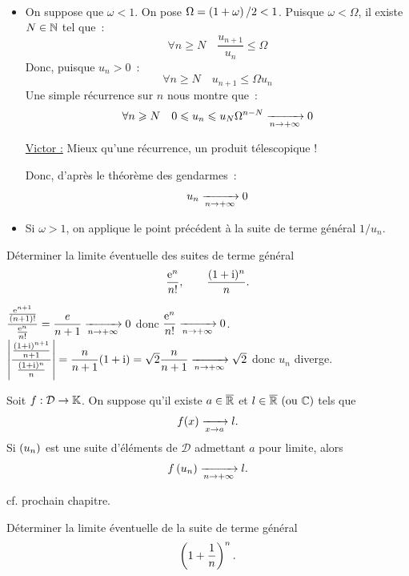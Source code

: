 \documentclass{magnoliaold}
\begin{document}
\begin{preuve}
$\quad$
\begin{itemize}
\item On suppose que $\omega<1$. On pose $\Omega=\left(1+\omega\right)/2 <1$. Puisque
  $\omega < \Omega$, il existe $N\in\mathbb{N}$ tel que~:
  \[\forall n\geq N \quad \frac{u_{n+1}}{u_n}\leq \Omega\]
  Donc, puisque $u_n>0$~:
  \[\forall n\geq N \quad u_{n+1} \leq \Omega u_n\]
  Une simple récurrence sur $n$ nous montre que~:
  \[\forall n\geqslant N\quad 0\leqslant u_n \leqslant u_N \Omega^{n-N} 
    \xrightarrow[n\rightarrow +\infty]{} 0\]
    
    \underline{Victor :} Mieux qu'une récurrence, un produit télescopique !
    
    
  Donc, d'après le théorème des gendarmes~:
 \[u_n \xrightarrow[n\rightarrow +\infty]{} 0\]
\item Si $\omega>1$, on applique le point précédent à la suite de terme général
  $1/u_n$.
\end{itemize}
\end{preuve}

\begin{exoUnique}
\exo Déterminer la limite éventuelle des suites de terme général
  \[\frac{{\rm e}^n}{n!}, \qquad \frac{(1+{\rm i})^n}{n}.\]
\end{exoUnique}

\begin{sol}
$\dfrac{\frac{{\rm e}^{n+1}}{(n+1)!}}{\frac{{\rm e}^n}{n!}}=\dfrac{e}{n+1}\xrightarrow[n\rightarrow +\infty]{}0$ donc $\dfrac{{\rm e}^n}{n!}\xrightarrow[n\rightarrow +\infty]{}0$.
\\
$\left|\dfrac{\frac{(1+{\rm i})^{n+1}}{n+1}}{\frac{(1+{\rm i})^n}{n}}\right|={\dfrac{n}{n+1}(1+{\rm i})}=\sqrt{2}\dfrac{n}{n+1}\xrightarrow[n\rightarrow +\infty]{}\sqrt{2}$ donc $u_n$ diverge.
\end{sol}




\begin{proposition}[utile=-3]
Soit $f:\mathcal{D}\to\mathbb{K}$. On suppose qu'il existe $a\in\overline{\mathbb{R}}$ et $l\in\text{$\overline{\mathbb{R}}$ (ou $\mathbb{C}$)}$ tels que
\[f(x)\xrightarrow[x\rightarrow a]{}l.\]
Si $\left(u_n\right)$ est une suite d'éléments de $\mathcal{D}$ admettant $a$ pour limite, alors
\[f\left(u_n\right)\xrightarrow[n\rightarrow +\infty]{} l.\]
\end{proposition}

\begin{preuve}
cf. prochain chapitre.
\end{preuve}

\begin{exoUnique}
\exo Déterminer la limite éventuelle de la suite de terme général
  \[\left(1+\frac{1}{n}\right)^n.\]
\end{exoUnique}
\end{document}
